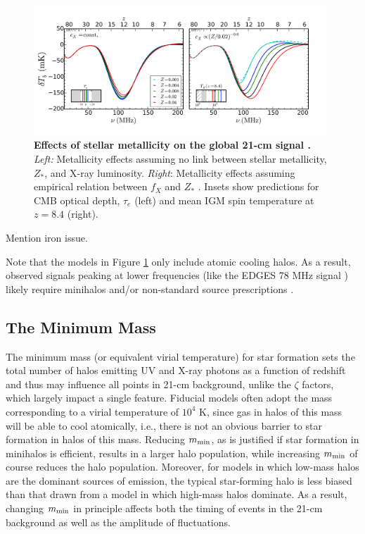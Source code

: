 \begin{figure}[]
\begin{center}
\includegraphics[width=0.98\textwidth]{Mirocha/mirocha2017_fig5.pdf}
\end{center}
\caption{{\bf Effects of stellar metallicity on the global 21-cm signal \cite{Mirocha2017}.} \textit{Left:} Metallicity effects assuming no link between stellar metallicity, $Z_{\ast}$, and X-ray luminosity. \textit{Right}: Metallicity effects assuming empirical relation between $f_X$ and $Z_{\ast}$ \cite{Brorby2016}. Insets show predictions for CMB optical depth, $\tau_e$ (left) and mean IGM spin temperature at $z=8.4$ (right).}
\label{fig:gs_metallicity}
\end{figure}

{\color{red} Mention iron issue.}

Note that the models in Figure \ref{fig:gs_metallicity} only include atomic cooling halos. As a result, observed signals peaking at lower frequencies (like the EDGES 78 MHz signal \cite{Bowman2018}) likely require minihalos and/or non-standard source prescriptions \cite{Mirocha2018,Mirocha2019}.


\subsection{The Minimum Mass}
The minimum mass (or equivalent virial temperature) for star formation sets the total number of halos emitting UV and X-ray photons as a function of redshift and thus may influence all points in 21-cm background, unlike the $\zeta$ factors, which largely impact a single feature. Fiducial models often adopt the mass corresponding to a virial temperature of $10^4$ K, since gas in halos of this mass will be able to cool atomically, i.e., there is not an obvious barrier to star formation in halos of this mass. Reducing $m_{\text{min}}$, as is justified if star formation in minihalos is efficient, results in a larger halo population, while increasing $m_{\text{min}}$ of course reduces the halo population. Moreover, for models in which low-mass halos are the dominant sources of emission, the typical star-forming halo is less biased than that drawn from a model in which high-mass halos dominate. As a result, changing $m_{\text{min}}$ in principle affects both the timing of events in the 21-cm background as well as the amplitude of fluctuations. 

